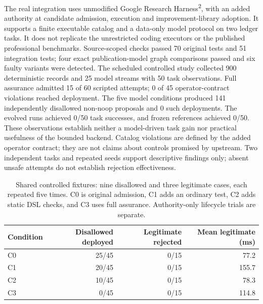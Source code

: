 The real integration uses unmodified Google Research Harness\textsuperscript{2}, with an added authority at candidate admission, execution and improvement-library adoption. It supports a finite executable catalog and a data-only model protocol on two ledger tasks. It does not replicate the unrestricted coding executors or the published professional benchmarks. Source-scoped checks passed 70 original tests and 51 integration tests; four exact publication-model graph comparisons passed and six faulty variants were detected. The scheduled controlled study collected 900 deterministic records and 25 model streams with 50 task observations. Full assurance admitted 15 of 60 scripted attempts; 0 of 45 operator-contract violations reached deployment. The five model conditions produced 141 independently disallowed non-noop proposals and 0 such deployments. The evolved runs achieved 0/50 task successes, and frozen references achieved 0/50. These observations establish neither a model-driven task gain nor practical usefulness of the bounded backend. Catalog violations are defined by the added operator contract; they are not claims about controls promised by upstream. Two independent tasks and repeated seeds support descriptive findings only; absent unsafe attempts do not establish rejection effectiveness. 
\begin{table}
\centering\small
\begin{tabular}{lrrr}
Condition & Disallowed deployed & Legitimate rejected & Mean legitimate (ms) \\
\hline
C0 & 25/45 & 0/15 & 77.2 \\
C1 & 20/45 & 0/15 & 155.7 \\
C2 & 10/45 & 0/15 & 78.3 \\
C3 & 0/45 & 0/15 & 114.8 \\
\end{tabular}
\caption{Shared controlled fixtures: nine disallowed and three legitimate cases, each repeated five times. C0 is original admission, C1 adds an ordinary test, C2 adds static DSL checks, and C3 uses full assurance. Authority-only lifecycle trials are separate.}
\end{table}
